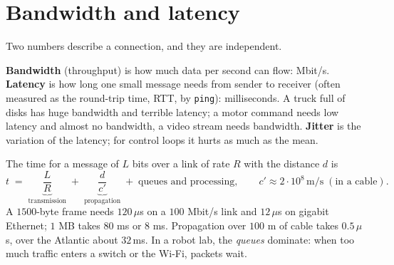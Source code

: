 \section*{Bandwidth and latency}
Two numbers describe a connection, and they are independent.
\begin{keyidea}
\textbf{Bandwidth} (throughput) is how much data per second can flow: Mbit/s. \textbf{Latency} is how long one small message needs from sender to receiver (often measured as the round-trip time, RTT, by \texttt{ping}): milliseconds. A truck full of disks has huge bandwidth and terrible latency; a motor command needs low latency and almost no bandwidth, a video stream needs bandwidth. \textbf{Jitter} is the variation of the latency; for control loops it hurts as much as the mean.
\end{keyidea}
The time for a message of $L$ bits over a link of rate $R$ with the distance $d$ is
\[
t \;=\; \underbrace{\frac{L}{R}}_{\text{transmission}} \;+\; \underbrace{\frac{d}{c'}}_{\text{propagation}} \;+\; \text{queues and processing},\qquad c'\approx2\cdot10^8\,\text{m/s}\;(\text{in a cable}).
\]
A $1500$-byte frame needs $120\,\mu$s on a $100$ Mbit/s link and $12\,\mu$s on gigabit Ethernet; $1$ MB takes $80$ ms or $8$ ms. Propagation over $100$ m of cable takes $0.5\,\mu$s, over the Atlantic about $32$\,ms. In a robot lab, the \emph{queues} dominate: when too much traffic enters a switch or the Wi-Fi, packets wait.

\begin{center}
\label{fig:hw2_rtt}
\end{center}

